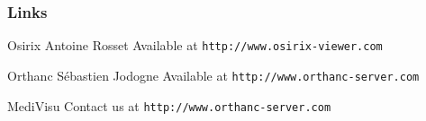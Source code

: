 \documentclass[11pt]{beamer}
\begin{document}
\begin{frame}
  \frametitle{Links}
    
  \begin{thebibliography}{10}
        
  \beamertemplatearticlebibitems
 
%
 
  	Osirix
    \newblock Antoine Rosset
    \newblock Available at {\tt http://www.osirix-viewer.com}
    
    \beamertemplatearticlebibitems
 
  	Orthanc
    \newblock Sébastien Jodogne
    \newblock Available at {\tt http://www.orthanc-server.com}
    
    MediVisu
    \newblock Contact us at {\tt http://www.orthanc-server.com}
 
  \end{thebibliography}
\end{frame}
\end{document}
